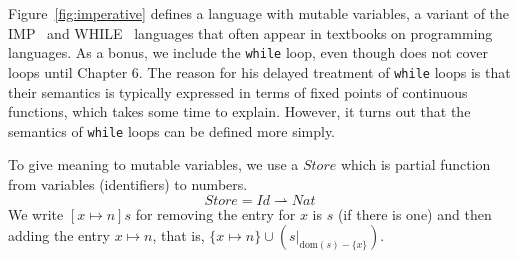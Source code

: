 \documentclass{tufte-handout}
\newcommand{\pto}[0]{\rightharpoonup}
\begin{document}

Figure~\ref{fig:imperative} defines a language with mutable variables,
a variant of the
IMP~\citep{Plotkin:1983aa,Winskel:1993uq,Amadio:1998fk} and
WHILE~\citep{Hoare:1969kw} languages that often appear in textbooks on
programming languages. As a bonus, we include the \texttt{while} loop,
even though \citet{Schmidt:1986vn} does not cover loops until Chapter
6. The reason for his delayed treatment of \texttt{while} loops is
that their semantics is typically expressed in terms of fixed points
of continuous functions, which takes some time to explain. However, it
turns out that the semantics of \texttt{while} loops can be defined
more simply.

To give meaning to mutable variables, we use a $\mathit{Store}$ which
is partial function from variables (identifiers) to numbers.
\[
  \mathit{Store} = \mathit{Id} \pto \mathit{Nat}
\]
We write $[x\mapsto n]s$ for removing the entry for $x$ is $s$
(if there is one) and then adding the entry $x\mapsto n$,
that is, $\{x\mapsto n\} \cup (s|_{\mathrm{dom}(s)-\{x\}})$.
\end{document}
